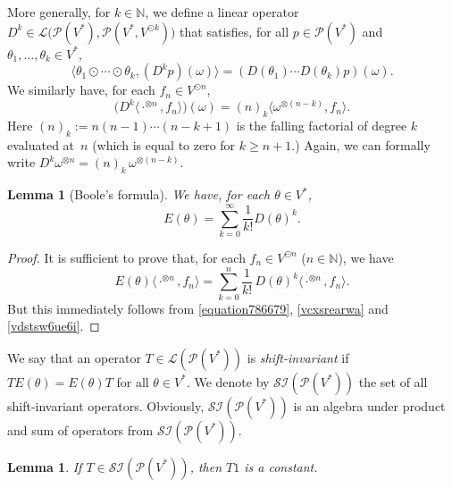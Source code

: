 \documentclass[12pt]{article}
\newtheorem{lemma}[theorem]{Lemma}
\theoremstyle{remark}
\theoremstyle{remark}
\theoremstyle{remark}
\begin{document}
More generally, for $k\in\mathbb N$, we define a linear operator $D^{k}\in\mathcal L\big(\mathcal P(V^*), \mathcal P(V^*,V^{\odot k})\big)$ that satisfies, for all $p\in\mathcal P(V^*)$ and $\theta_1,\dots,\theta_k \in V^*$, 
\begin{equation}\label{vcxsrearwa}
\langle \theta_1\odot\cdots\odot\theta_k,  (D^{k} p)(\omega)\rangle =(D(\theta_1)\dotsm D(\theta_k)p)(\omega).
\end{equation}
We similarly have, for each $f_n\in V^{\odot n}$, 
\begin{equation}\label{vdstsw6ue6i}
\big(D^{k}\langle\cdot^{\otimes n},f_n\rangle\big)(\omega)=(n)_k\langle\omega^{\otimes (n-k)},f_n\rangle.
\end{equation}
 Here $(n)_k:=n(n-1)\dotsm(n-k+1)$ is the falling factorial of degree $k$ evaluated at~$n$ (which is equal to zero for $k\ge n+1$.) Again, we can formally write $D^{k}\omega^{\otimes n}=(n)_k\,\omega^{\otimes(n-k)}$.






\begin{lemma}[Boole's formula] \label{fghj9876b}
We have, for each $\theta \in V^*$,
\begin{equation*} E(\theta)=\sum_{k=0}^{\infty}\frac{1}{k!}{D(\theta)}^k. \end{equation*}
\end{lemma}


\begin{proof}It is sufficient to prove that, for each $f_n\in V^{\odot n}$ ($n\in \mathbb{N}$), we have
$$ E(\theta)\langle \cdot^{\otimes n},f_n\rangle=\sum_{k=0}^{n}\frac{1}{k!}\,D(\theta)^k \langle \cdot^{\otimes n},f_n\rangle.$$
  But 
this immediately follows from \eqref{equation786679}, \eqref{vcxsrearwa}  and \eqref{vdstsw6ue6i}.
\end{proof}


We say that an operator $T\in \mathcal L (\mathcal P  (V^*))$ is {\it shift-invariant} if 
$TE(\theta)=E(\theta)T$ for all $\theta \in V^* $. We denote by $\mathcal {SI}(\mathcal P  (V^*))$ the set of all shift-invariant operators. Obviously,  $\mathcal{SI}(\mathcal P  (V^*))$ is an algebra under product and sum of operators from $\mathcal{SI}(\mathcal P  (V^*))$.


\begin{lemma}\label{rssw654w6u4weu6}
If $T\in \mathcal{SI}(\mathcal P  (V^*))$, then $T 1$ is a constant.
\end{lemma}
\end{document}
